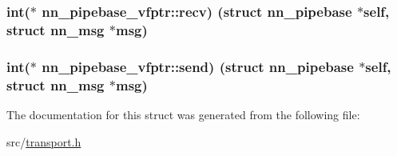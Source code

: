 \subsubsection[{recv}]{\setlength{\rightskip}{0pt plus 5cm}int($\ast$ nn\+\_\+pipebase\+\_\+vfptr\+::recv) (struct {\bf nn\+\_\+pipebase} $\ast$self, struct {\bf nn\+\_\+msg} $\ast$msg)}\hypertarget{structnn__pipebase__vfptr_a0e5133204ccaf510ef71b89ea3083c45}{}\label{structnn__pipebase__vfptr_a0e5133204ccaf510ef71b89ea3083c45}
\subsubsection[{send}]{\setlength{\rightskip}{0pt plus 5cm}int($\ast$ nn\+\_\+pipebase\+\_\+vfptr\+::send) (struct {\bf nn\+\_\+pipebase} $\ast$self, struct {\bf nn\+\_\+msg} $\ast$msg)}\hypertarget{structnn__pipebase__vfptr_af11809ca13dbddb6d8640d701aa284b8}{}\label{structnn__pipebase__vfptr_af11809ca13dbddb6d8640d701aa284b8}


The documentation for this struct was generated from the following file\+:\begin{DoxyCompactItemize}
\item 
src/\hyperlink{transport_8h}{transport.\+h}\end{DoxyCompactItemize}
